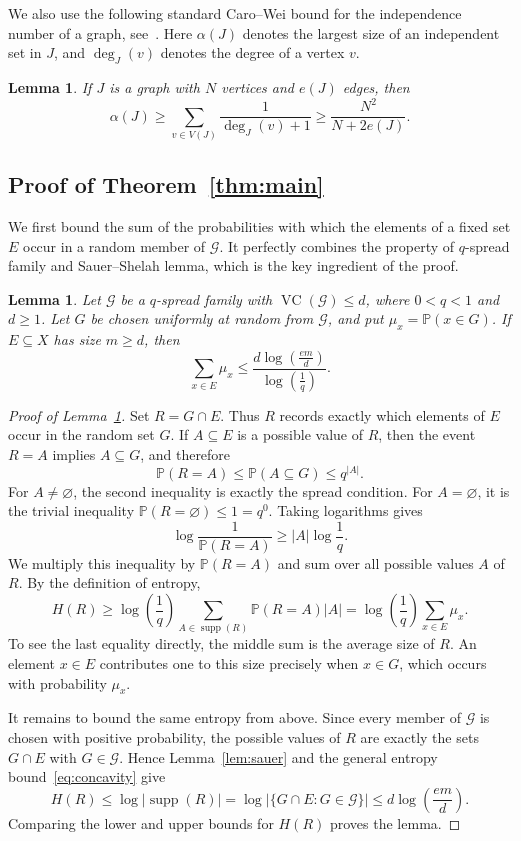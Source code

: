 \documentclass[11pt]{article}
\newtheorem{lemma}[theorem]{Lemma}
\theoremstyle{definition}
\newcommand*{\abs}[1]{\lvert#1\rvert}
\newcommand{\cG}{\mathcal{G}}
\newcommand{\VC}{\operatorname{VC}}
\begin{document}
We also use the following standard Caro--Wei bound for the independence number of a graph, see~\cite{AS16}. Here \(\alpha(J)\) denotes the largest size of an independent set in \(J\), and \(\deg_{J}(v)\) denotes the degree of a vertex \(v\).

\begin{lemma}\label{lem:independence}
If \(J\) is a graph with \(N\) vertices and \(e(J)\) edges, then
\[
\alpha(J)\ge \sum_{v\in V(J)}\frac{1}{\deg_{J}(v)+1}\ge \frac{N^{2}}{N+2e(J)}.
\]
\end{lemma}

\subsection{Proof of Theorem~\ref{thm:main}}

We first bound the sum of the probabilities with which the elements of a fixed set \(E\) occur in a random member of \(\cG\). It perfectly combines the property of \(q\)-spread family and Sauer--Shelah lemma, which is the key ingredient of the proof.

\begin{lemma}\label{lem:local-entropy}
Let \(\cG\) be a \(q\)-spread family with \(\VC(\cG)\le d\), where \(0<q<1\) and \(d\ge 1\). Let \(G\) be chosen uniformly at random from \(\cG\), and put \(\mu_{x}=\mathbb{P}(x\in G)\). If \(E\subseteq X\) has size \(m\ge d\), then
\[
\sum_{x\in E}\mu_{x}\le \frac{d\log\left(\frac{em}{d}\right)}{\log\left(\frac{1}{q}\right)}.
\]
\end{lemma}

\begin{proof}[Proof of Lemma~\ref{lem:local-entropy}]
Set \(R=G\cap E\). Thus \(R\) records exactly which elements of \(E\) occur in the random set \(G\). If \(A\subseteq E\) is a possible value of \(R\), then the event \(R=A\) implies \(A\subseteq G\), and therefore
\[
\mathbb{P}(R=A)\le \mathbb{P}(A\subseteq G)\le q^{\abs{A}}.
\]
For \(A\ne\varnothing\), the second inequality is exactly the spread condition. For \(A=\varnothing\), it is the trivial inequality \(\mathbb{P}(R=\varnothing)\le 1=q^{0}\). Taking logarithms gives
\[
\log\frac{1}{\mathbb{P}(R=A)}\ge \abs{A}\log\frac{1}{q}.
\]
We multiply this inequality by \(\mathbb{P}(R=A)\) and sum over all possible values \(A\) of \(R\). By the definition of entropy,
\[
H(R)\ge \log\left(\frac{1}{q}\right)\sum_{A\in\operatorname{supp}(R)}\mathbb{P}(R=A)\abs{A}
=\log\left(\frac{1}{q}\right)\sum_{x\in E}\mu_{x}.
\]
To see the last equality directly, the middle sum is the average size of \(R\). An element \(x\in E\) contributes one to this size precisely when \(x\in G\), which occurs with probability \(\mu_{x}\).

It remains to bound the same entropy from above. Since every member of \(\cG\) is chosen with positive probability, the possible values of \(R\) are exactly the sets \(G\cap E\) with \(G\in\cG\). Hence Lemma~\ref{lem:sauer} and the general entropy bound~\eqref{eq:concavity} give
\[
H(R)\le\log\abs{\operatorname{supp}(R)}
=\log\abs{\{G\cap E:G\in\cG\}}
\le d\log\left(\frac{em}{d}\right).
\]
Comparing the lower and upper bounds for \(H(R)\) proves the lemma.
\end{proof}
\end{document}
